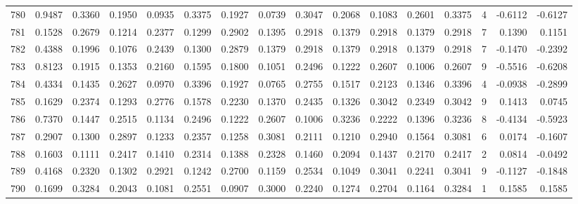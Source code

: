 \begin{tabular}{lrrrrrrrrrrrrrrr}
780 &      0.9487 &  0.3360 &  0.1950 &  0.0935 &  0.3375 &  0.1927 &  0.0739 &  0.3047 &  0.2068 &  0.1083 &   0.2601 &     0.3375 &      4 &                   -0.6112 &                    -0.6127 \\
781 &      0.1528 &  0.2679 &  0.1214 &  0.2377 &  0.1299 &  0.2902 &  0.1395 &  0.2918 &  0.1379 &  0.2918 &   0.1379 &     0.2918 &      7 &                    0.1390 &                     0.1151 \\
782 &      0.4388 &  0.1996 &  0.1076 &  0.2439 &  0.1300 &  0.2879 &  0.1379 &  0.2918 &  0.1379 &  0.2918 &   0.1379 &     0.2918 &      7 &                   -0.1470 &                    -0.2392 \\
783 &      0.8123 &  0.1915 &  0.1353 &  0.2160 &  0.1595 &  0.1800 &  0.1051 &  0.2496 &  0.1222 &  0.2607 &   0.1006 &     0.2607 &      9 &                   -0.5516 &                    -0.6208 \\
784 &      0.4334 &  0.1435 &  0.2627 &  0.0970 &  0.3396 &  0.1927 &  0.0765 &  0.2755 &  0.1517 &  0.2123 &   0.1346 &     0.3396 &      4 &                   -0.0938 &                    -0.2899 \\
785 &      0.1629 &  0.2374 &  0.1293 &  0.2776 &  0.1578 &  0.2230 &  0.1370 &  0.2435 &  0.1326 &  0.3042 &   0.2349 &     0.3042 &      9 &                    0.1413 &                     0.0745 \\
786 &      0.7370 &  0.1447 &  0.2515 &  0.1134 &  0.2496 &  0.1222 &  0.2607 &  0.1006 &  0.3236 &  0.2222 &   0.1396 &     0.3236 &      8 &                   -0.4134 &                    -0.5923 \\
787 &      0.2907 &  0.1300 &  0.2897 &  0.1233 &  0.2357 &  0.1258 &  0.3081 &  0.2111 &  0.1210 &  0.2940 &   0.1564 &     0.3081 &      6 &                    0.0174 &                    -0.1607 \\
788 &      0.1603 &  0.1111 &  0.2417 &  0.1410 &  0.2314 &  0.1388 &  0.2328 &  0.1460 &  0.2094 &  0.1437 &   0.2170 &     0.2417 &      2 &                    0.0814 &                    -0.0492 \\
789 &      0.4168 &  0.2320 &  0.1302 &  0.2921 &  0.1242 &  0.2700 &  0.1159 &  0.2534 &  0.1049 &  0.3041 &   0.2241 &     0.3041 &      9 &                   -0.1127 &                    -0.1848 \\
790 &      0.1699 &  0.3284 &  0.2043 &  0.1081 &  0.2551 &  0.0907 &  0.3000 &  0.2240 &  0.1274 &  0.2704 &   0.1164 &     0.3284 &      1 &                    0.1585 &                     0.1585 \\

\end{tabular}
